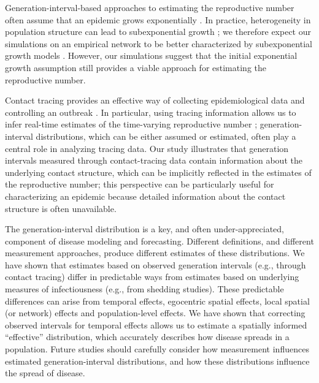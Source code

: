 \documentclass[12pt]{article}
\begin{document}
Generation-interval-based approaches to estimating the reproductive number often assume that an epidemic grows exponentially \citep{wearing2005appropriate, wallinga2007generation, roberts2007model, park2019practical}.
In practice, heterogeneity in population structure can lead to subexponential growth \citep{szendroi2004polynomial, chowell2015western, chowell2016growing, chowell2016characterizing, kiskowski2016modeling, viboud2016generalized};
we therefore expect our simulations on an empirical network to be better characterized by subexponential growth models \citep{viboud2016generalized}.
However, our simulations suggest that the initial exponential growth assumption still provides a viable approach for estimating the reproductive number.

Contact tracing provides an effective way of collecting epidemiological data and controlling an outbreak \citep{clarke1998contact, eames2003contact, donnelly2003epidemiological}.
In particular, using tracing information allows us to infer real-time estimates of the time-varying reproductive number \citep{cauchemez2006estimating, hens2012robust, jewell2012enhancing, soetens2018real};
generation-interval distributions, which can be either assumed or estimated, often play a central role in analyzing tracing data.
Our study illustrates that generation intervals measured through contact-tracing data contain information about the underlying contact structure, which can be implicitly reflected in the estimates of the reproductive number;
this perspective can be particularly useful for characterizing an epidemic because detailed information about the contact structure is often unavailable.

The generation-interval distribution is a key, and often under-appreciated, component of disease modeling and forecasting.
Different definitions, and different measurement approaches, produce different estimates of these distributions.
We have shown that estimates based on observed generation intervals (e.g., through contact tracing) differ in predictable ways from estimates based on underlying measures of infectiousness (e.g., from shedding studies).
These predictable differences can arise from temporal effects, egocentric spatial effects, local spatial (or network) effects and population-level effects.
We have shown that correcting observed intervals for temporal effects allows us to estimate a spatially informed ``effective'' distribution, which accurately describes how disease spreads in a population. 
Future studies should carefully consider how measurement influences estimated generation-interval distributions, and how these distributions influence the spread of disease. 
\end{document}
